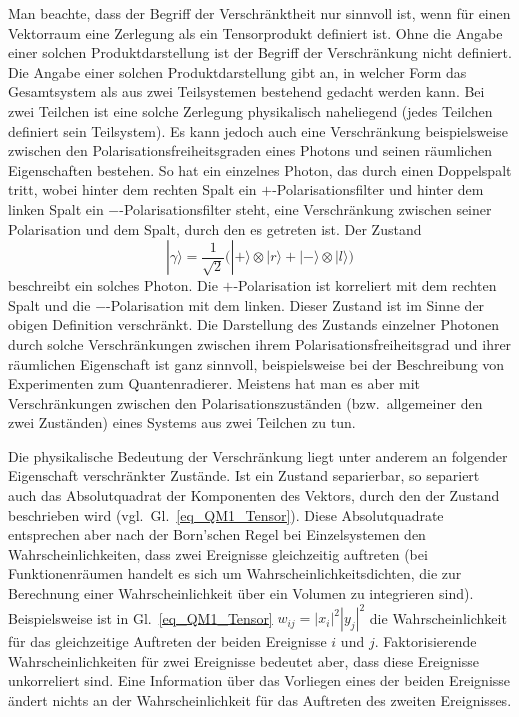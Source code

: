 Man beachte, dass der Begriff der Verschr\"anktheit nur sinnvoll ist, wenn f\"ur einen Vektorraum eine
Zerlegung als ein Tensorprodukt definiert ist. Ohne die Angabe einer solchen Produktdarstellung ist
der Begriff der Verschr\"ankung nicht definiert. Die Angabe einer solchen Produktdarstellung gibt an,
in welcher Form das Gesamtsystem als aus zwei Teilsystemen bestehend gedacht werden kann. Bei
zwei Teilchen ist eine solche Zerlegung physikalisch naheliegend (jedes Teilchen definiert sein Teilsystem). 
Es kann jedoch auch eine Verschr\"ankung beispielsweise zwischen den Polarisationsfreiheitsgraden
eines Photons und seinen r\"aumlichen Eigenschaften bestehen. So hat ein einzelnes Photon, das
durch einen Doppelspalt tritt, wobei hinter dem rechten Spalt ein $+$-Polarisationsfilter und hinter dem
linken Spalt ein $-$-Polarisationsfilter steht, eine Verschr\"ankung zwischen seiner Polarisation und dem
Spalt, durch den es getreten ist. Der Zustand
\begin{equation}
        | \gamma \rangle = \frac{1}{\sqrt{2}} \Big( |+\rangle \otimes |r \rangle + |- \rangle \otimes |l\rangle \Big)
\end{equation}
beschreibt ein solches Photon. Die $+$-Polarisation ist korreliert mit dem rechten Spalt und die $-$-Polarisation
mit dem linken. Dieser Zustand ist im Sinne der obigen Definition verschr\"ankt. Die Darstellung des Zustands
einzelner Photonen durch solche Verschr\"ankungen
zwischen ihrem Polarisationsfreiheitsgrad und ihrer r\"aumlichen Eigenschaft ist
ganz sinnvoll, beispielsweise bei der Beschreibung von Experimenten zum Quantenradierer. Meistens hat man es aber mit
Verschr\"ankungen zwischen den Polarisationszust\"anden (bzw.\ allgemeiner den zwei Zust\"anden) 
eines Systems aus zwei Teilchen zu tun. 

Die physikalische Bedeutung der Verschr\"ankung liegt unter anderem an folgender Eigenschaft 
verschr\"ankter Zust\"ande. Ist ein Zustand separierbar, so separiert auch das Absolutquadrat 
der Komponenten des Vektors, durch den der Zustand beschrieben wird (vgl.\ Gl.\ \ref{eq_QM1_Tensor}).
Diese Absolutquadrate entsprechen aber nach der Born'schen Regel 
bei Einzelsystemen den Wahrscheinlichkeiten, dass 
zwei Ereignisse gleichzeitig auftreten (bei Funktionenr\"aumen handelt es sich um Wahrscheinlichkeitsdichten,
die zur Berechnung einer Wahrscheinlichkeit \"uber ein Volumen zu integrieren sind). Beispielsweise ist
in Gl.\ \ref{eq_QM1_Tensor} $w_{ij}=|x_i|^2|y_j|^2$ die Wahrscheinlichkeit f\"ur das gleichzeitige Auftreten der
beiden Ereignisse $i$ und $j$. Faktorisierende
Wahrscheinlichkeiten f\"ur zwei Ereignisse bedeutet aber, dass diese Ereignisse unkorreliert sind. 
Eine Information \"uber das Vorliegen eines der beiden Ereignisse \"andert nichts an der Wahrscheinlichkeit
f\"ur das Auftreten des zweiten Ereignisses. 

